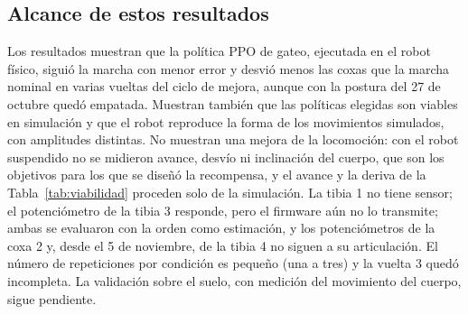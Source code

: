 \subsection{Alcance de estos resultados}

Los resultados muestran que la política PPO de gateo, ejecutada en el robot
físico, siguió la marcha con menor error y desvió menos las coxas que la marcha
nominal en varias vueltas del ciclo de mejora, aunque con la postura del 27 de
octubre quedó empatada. Muestran también que las políticas elegidas son viables en
simulación y que el robot reproduce la forma de los movimientos simulados, con
amplitudes distintas. No muestran una mejora de la locomoción: con el robot
suspendido no se midieron avance, desvío ni inclinación del cuerpo, que son los
objetivos para los que se diseñó la recompensa, y el avance y la deriva de la
Tabla~\ref{tab:viabilidad} proceden solo de la simulación. La tibia 1 no tiene
sensor; el potenciómetro de la tibia 3 responde, pero el firmware aún no lo
transmite; ambas se evaluaron con la orden como estimación, y los potenciómetros de la
coxa 2 y, desde el 5 de noviembre, de la tibia 4 no siguen a su articulación. El número de repeticiones por condición es pequeño (una
a tres) y la vuelta 3 quedó incompleta. La validación sobre el suelo, con medición
del movimiento del cuerpo, sigue pendiente.
